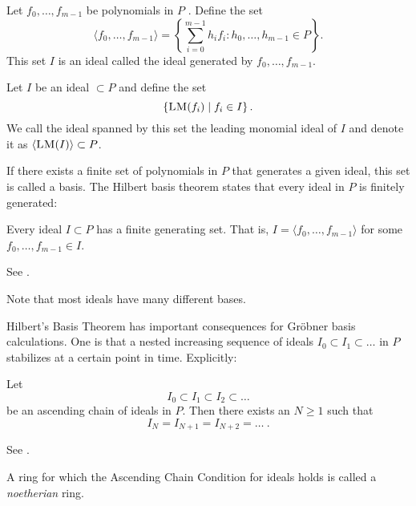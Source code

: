 \begin{definition}
Let $f_0 ,\dots , f_{m-1}$ be polynomials in $P$ . Define the set
\[
\langle f_0 , \dots , f_{m-1}\rangle = \left\{ \sum_{i=0}^{m-1} h_i f_i : h_0 ,\dots , h_{m-1} \in P \right\}.
\]
This set $I$ is an ideal called the ideal generated by $f_0, \dots, f_{m-1}$.
\end{definition}

\begin{definition}
Let $I$ be an ideal $\subset P$ and define the set
\[
 \left\{ \textsc{LM}(f_i) \mid f_i \in I\right\}.
\]
We call the ideal spanned by this set the leading monomial ideal of $I$ and denote it as $\langle \textsc{LM}(I) \rangle \subset P$.
\end{definition}

If there exists a finite set of polynomials in $P$ that generates a given ideal, this set is called a basis. The Hilbert basis theorem states that every ideal in $P$ is finitely generated:

\begin{theorem}
\label{theorem:hilbbase}
Every ideal $I \subset P$ has a finite generating set. That is, $I = \langle
f_0, \dots, f_{m-1} \rangle$ for some $f_0,
\dots, f_{m-1} \in I$.
\end{theorem}

\begin{citeproof} 
See \cite[p. 74]{Cox2005}.
\end{citeproof}

Note that most ideals have many different bases.

Hilbert's Basis Theorem has important consequences for Gröbner basis calculations. One is that a nested
increasing sequence of ideals $I_0 \subset I_1 \subset \dots$ in $P$ stabilizes at a certain point in time. Explicitly:

\begin{theorem} 
\label{theorem:acc}
Let 
\[
I_0 \subset I_1 \subset I_2 \subset \dots
\]
be an ascending chain of ideals in $P$. Then there exists an $N \geq 1$ such that 
\[
I_{N} = I_{N+1} = I_{N+2} = \dots\ .
\]
\end{theorem}

\begin{citeproof}
See \cite[p.76]{Cox2005}.
\end{citeproof}

\begin{definition}
A ring for which the Ascending Chain Condition for ideals holds is called a \emph{noetherian} ring.
\end{definition}


